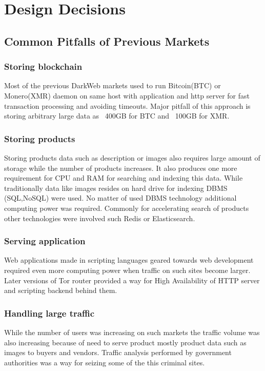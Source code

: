 \documentclass[journal]{IEEEtran} %
\begin{document}
    
    
\section{Design Decisions}
    \subsection{Common Pitfalls of Previous Markets}
        \subsubsection{Storing blockchain}
            Most of the previous DarkWeb markets used to run Bitcoin(BTC) or Monero(XMR) daemon on same host with application and http server for fast transaction processing and avoiding timeouts. Major pitfall of this approach is storing arbitrary large data as ~400GB for BTC and ~100GB for XMR.\\
            
        \subsubsection{Storing products}
            Storing products data such as description or images also requires large amount of storage while the number of products increases. It also produces one more requirement for CPU and RAM for searching and indexing this data. While traditionally data like images resides on hard drive for indexing DBMS (SQL,NoSQL) were used. No matter of used DBMS technology additional computing power was required. Commonly for accelerating search of products other technologies were involved such Redis or Elasticsearch.\\
            
        \subsubsection{Serving application}
            Web applications made in scripting languages geared towards web development required even more computing power when traffic on such sites become larger. Later versions of Tor router provided a way for High Availability of HTTP server and scripting backend behind them.\\
            
        \subsubsection{Handling large traffic}
            While the number of users was increasing on such markets the traffic volume was also increasing because of need to serve product mostly product data such as images to buyers and vendors. Traffic analysis performed by government authorities was a way for seizing some of the this criminal sites.\\
            
\end{document}
